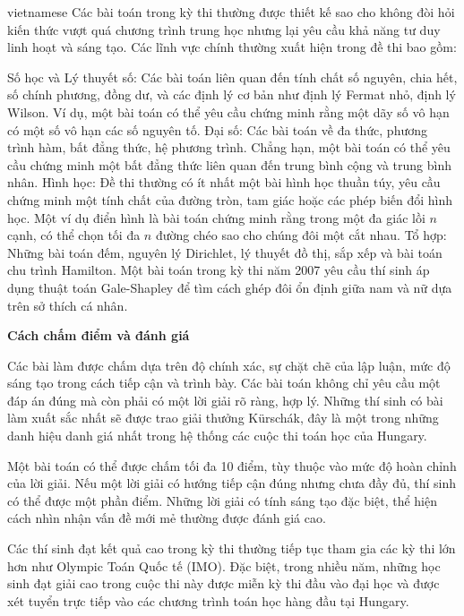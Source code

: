 \documentclass{article}
\begin{document}
\begin{otherlanguage*}{vietnamese}
Các bài toán trong kỳ thi thường được thiết kế sao cho không đòi hỏi kiến thức vượt quá chương trình trung học nhưng lại yêu cầu khả năng tư duy linh hoạt và sáng tạo.
Các lĩnh vực chính thường xuất hiện trong đề thi bao gồm:
\begin{itemize}[topsep=0pt, partopsep=0pt, itemsep=0pt]
    \ii Số học và Lý thuyết số: Các bài toán liên quan đến tính chất số nguyên, chia hết, số chính phương, đồng dư, và các định lý cơ bản như định lý Fermat nhỏ, định lý Wilson.
    Ví dụ, một bài toán có thể yêu cầu chứng minh rằng một dãy số vô hạn có một số vô hạn các số nguyên tố.
    \ii Đại số: Các bài toán về đa thức, phương trình hàm, bất đẳng thức, hệ phương trình.
    Chẳng hạn, một bài toán có thể yêu cầu chứng minh một bất đẳng thức liên quan đến trung bình cộng và trung bình nhân.
    \ii Hình học: Đề thi thường có ít nhất một bài hình học thuần túy, yêu cầu chứng minh một tính chất của đường tròn, tam giác hoặc các phép biến đổi hình học.
    Một ví dụ điển hình là bài toán chứng minh rằng trong một đa giác lồi $n$ cạnh, có thể chọn tối đa $n$ đường chéo sao cho chúng đôi một cắt nhau.
    \ii Tổ hợp: Những bài toán đếm, nguyên lý Dirichlet, lý thuyết đồ thị, sắp xếp và bài toán chu trình Hamilton.
    Một bài toán trong kỳ thi năm 2007 yêu cầu thí sinh áp dụng thuật toán Gale-Shapley để tìm cách ghép đôi ổn định giữa nam và nữ dựa trên sở thích cá nhân.
\end{itemize}

\textbf{Cách chấm điểm và đánh giá}

Các bài làm được chấm dựa trên độ chính xác, sự chặt chẽ của lập luận, mức độ sáng tạo trong cách tiếp cận và trình bày.
Các bài toán không chỉ yêu cầu một đáp án đúng mà còn phải có một lời giải rõ ràng, hợp lý.
Những thí sinh có bài làm xuất sắc nhất sẽ được trao giải thưởng Kürschák, đây là một trong những danh hiệu danh giá nhất trong hệ thống các cuộc thi toán học của Hungary.

Một bài toán có thể được chấm tối đa 10 điểm, tùy thuộc vào mức độ hoàn chỉnh của lời giải.
Nếu một lời giải có hướng tiếp cận đúng nhưng chưa đầy đủ, thí sinh có thể được một phần điểm.
Những lời giải có tính sáng tạo đặc biệt, thể hiện cách nhìn nhận vấn đề mới mẻ thường được đánh giá cao.

Các thí sinh đạt kết quả cao trong kỳ thi thường tiếp tục tham gia các kỳ thi lớn hơn như Olympic Toán Quốc tế (IMO).
Đặc biệt, trong nhiều năm, những học sinh đạt giải cao trong cuộc thi này được miễn kỳ thi đầu vào đại học và được xét tuyển trực tiếp vào các chương trình toán học hàng đầu tại Hungary.


\end{otherlanguage*}
\end{document}

